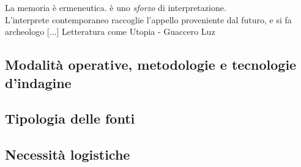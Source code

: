 \documentclass[a4paper,12pt]{article}
\begin{document}
La memoria è ermeneutica. è uno \emph{sforzo} di interpretazione. \\
L'interprete contemporaneo raccoglie l'appello proveniente dal futuro, e si fa archeologo [...]
Letteratura come Utopia - Guaccero Luz \\



\subsection{Modalità operative, metodologie e tecnologie d'indagine}

\subsection{Tipologia delle fonti}

\subsection{Necessità logistiche}
\end{document}
